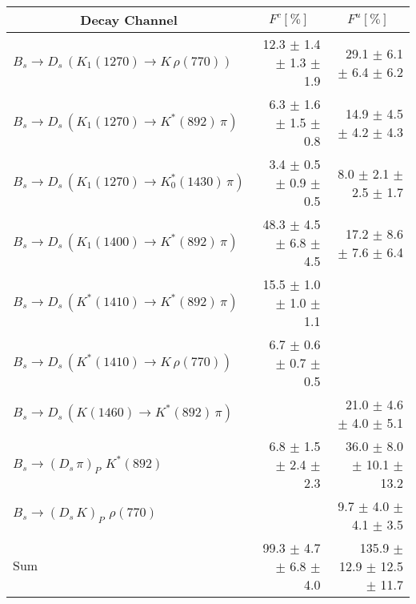 \begin{tabular}{l r r } 
\toprule
\multicolumn{1}{c}{Decay Channel} & \multicolumn{1}{c}{$F^{c} [\%]$} & \multicolumn{1}{c}{$F^{u} [\%]$}  \\ 
\hline
$B_s \to D_s \, ( K_1(1270) \to K \, \rho(770) )$ & 12.3 $\pm$ 1.4 $\pm$ 1.3 $\pm$ 1.9 & 29.1 $\pm$ 6.1 $\pm$ 6.4 $\pm$ 6.2 \\ 
$B_s \to D_s \, ( K_1(1270) \to K^{*}(892) \, \pi )$ & 6.3 $\pm$ 1.6 $\pm$ 1.5 $\pm$ 0.8 & 14.9 $\pm$ 4.5 $\pm$ 4.2 $\pm$ 4.3 \\ 
$B_s \to D_s \, ( K_1(1270) \to K^{*}_{0}(1430) \, \pi )$ & 3.4 $\pm$ 0.5 $\pm$ 0.9 $\pm$ 0.5 & 8.0 $\pm$ 2.1 $\pm$ 2.5 $\pm$ 1.7 \\ 
$B_s \to D_s \, ( K_1(1400) \to K^{*}(892) \, \pi )$ & 48.3 $\pm$ 4.5 $\pm$ 6.8 $\pm$ 4.5 & 17.2 $\pm$ 8.6 $\pm$ 7.6 $\pm$ 6.4 \\ 
$B_s \to D_s \, ( K^{*}(1410) \to K^{*}(892) \, \pi )$ & 15.5 $\pm$ 1.0 $\pm$ 1.0 $\pm$ 1.1 &  \\ 
$B_s \to D_s \, ( K^{*}(1410) \to K \, \rho(770) )$ & 6.7 $\pm$ 0.6 $\pm$ 0.7 $\pm$ 0.5 &  \\ 
$B_s \to D_s \, ( K(1460) \to K^{*}(892) \, \pi )$ &  & 21.0 $\pm$ 4.6 $\pm$ 4.0 $\pm$ 5.1 \\ 
$B_s \to ( D_s \, \pi)_{P} \, \, K^{*}(892)$ & 6.8 $\pm$ 1.5 $\pm$ 2.4 $\pm$ 2.3 & 36.0 $\pm$ 8.0 $\pm$ 10.1 $\pm$ 13.2 \\ 
$B_s \to ( D_s \, K)_{P} \, \, \rho(770)$ &  & 9.7 $\pm$ 4.0 $\pm$ 4.1 $\pm$ 3.5 \\ 
\hline
$\text{Sum}$ & 99.3 $\pm$ 4.7 $\pm$ 6.8 $\pm$ 4.0 & 135.9 $\pm$ 12.9 $\pm$ 12.5 $\pm$ 11.7 \\ 
\bottomrule
\end{tabular}
